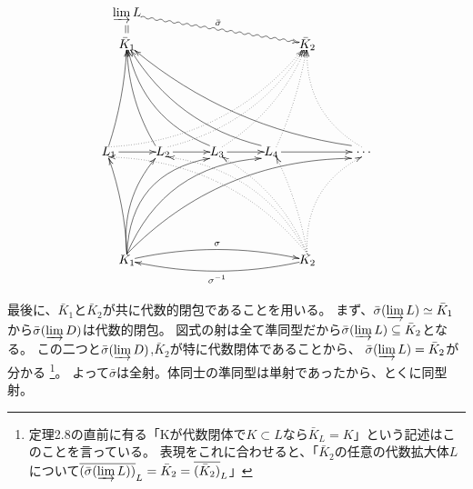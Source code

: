 \documentclass[a4j]{jarticle}
\begin{document}
    \[
    \begin{xy}
        (00, 30)    *{L_1}="L1",
        (15, 30)    *{L_2}="L2",
        (30, 30)    *{L_3}="L3",
        (45, 30)    *{L_4}="L4",
        (70, 30)    *{~\dots}="Li",
        (5, 60)     *{\bar{K}_1}="cK1",
        (5, 00)     *{K_1}="K1",
        (55, 60)    *{\bar{K}_2}="cK2",
        (55, 00)    *{K_2}="K2",
        (5, 68)     *{\varinjlim L}="lim",

        \ar@{->}            "L1"+<0.8em,0em>;"L2"
        \ar@{->}            "L2"+<0.8em,0em>;"L3"
        \ar@{->}            "L3"+<0.8em,0em>;"L4"
        \ar@{->}            "L4"+<0.8em,0em>;"Li"

        \ar@{->}@/_1mm/ "K1"+<0.0em,0.5em>;"L1"+<-0.0em,-0.5em>
        \ar@{->}@/^3mm/ "K1"+<0.0em,0.5em>;"L2"+<-0.6em,-0.5em>
        \ar@{->}@/^7mm/ "K1"+<0.0em,0.5em>;"L3"+<-0.6em,-0.5em>
        \ar@{->}@/^7mm/ "K1"+<0.0em,0.5em>;"L4"+<-0.8em,-0.5em>
        \ar@{->}@/^7mm/ "K1"+<0.0em,0.5em>;"Li"+<-0.8em,-0.5em>
        \ar@{->}@/_1mm/ "L1"+<-0.0em,0.5em>;"cK1"
        \ar@{->}@/^2mm/ "L2"+<-0.6em,0.5em>;"cK1"
        \ar@{->}@/^5mm/ "L3"+<-0.6em,0.5em>;"cK1"
        \ar@{->}@/^5mm/ "L4"+<-0.8em,0.5em>;"cK1"
        \ar@{->}@/^5mm/ "Li"+<-0.8em,0.5em>;"cK1"

        \ar@{.>}@/_7mm/ "K2"+<0.0em,0.5em>;"L1"+<0.0em,-0.4em>
        \ar@{.>}@/_6mm/ "K2"+<0.0em,0.5em>;"L2"+<0.4em,-0.4em>
        \ar@{.>}@/_3mm/ "K2"+<0.0em,0.5em>;"L3"+<0.4em,-0.4em>
        \ar@{.>}@/_1mm/ "K2"+<0.0em,0.5em>;"L4"+<0.4em,-0.4em>
        \ar@{.>}@/^5mm/ "K2"+<0.0em,0.5em>;"Li"+<0.0em,-0.4em>
        \ar@{.>}@/_7mm/ "L1"+<0.0em,0.4em>;"cK2"
        \ar@{.>}@/_5mm/ "L2"+<0.4em,0.4em>;"cK2"
        \ar@{.>}@/_3mm/ "L3"+<0.4em,0.4em>;"cK2"
        \ar@{.>}@/_1mm/ "L4"+<0.4em,0.4em>;"cK2"
        \ar@{.>}@/^5mm/ "Li"+<0.0em,0.4em>;"cK2"

        \ar@{->}@/^3mm/^{\sigma} "K1";"K2"
        \ar@{->}@/^3mm/^{\sigma^{-1}} "K2";"K1"

        \ar@{=} "cK1"+<0mm,3mm>;"lim"+<0mm,-3mm>
        \ar@{~>}^{\bar{\sigma}} "lim";"cK2"
    \end{xy}
    \]

    最後に、$\bar{K}_1$と$\bar{K}_2$が共に代数的閉包であることを用いる。
    まず、$\bar{\sigma}(\varinjlim L) \simeq \bar{K}_1$から$\bar{\sigma}(\varinjlim D)$は代数的閉包。
    図式の射は全て準同型だから$\bar{\sigma}(\varinjlim L) \subseteq \bar{K}_2$となる。
    この二つと$\bar{\sigma}(\varinjlim D)$,$\bar{K}_2$が特に代数閉体であることから、
    $\bar{\sigma}(\varinjlim L)=\bar{K}_2$が分かる
    \footnote{定理2.8の直前に有る「Kが代数閉体で$K \subset L$なら$\bar{K}_L=K$」という記述はこのことを言っている。
    表現をこれに合わせると、「$\bar{K}_2$の任意の代数拡大体$L$について$\overline{(\bar{\sigma}(\varinjlim L))}_L=\bar{K}_2=\overline{(\bar{K}_2)}_L$」}。
    よって$\bar{\sigma}$は全射。体同士の準同型は単射であったから、とくに同型射。
\end{document}
